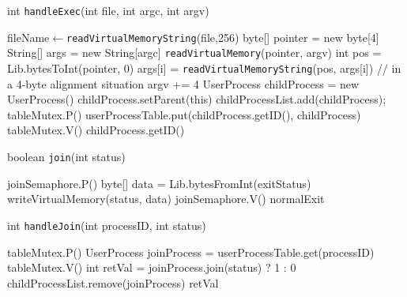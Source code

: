\documentclass{article}
\newcommand{\eq}{$\leftarrow$}
\begin{document}
\begin{spacing}{1.1}
\begin{algorithm}[htbp]
\label{alg:handleExec}
\caption{int \texttt{handleExec}(int file, int argc, int argv)}
  \begin{algorithmic}[1]
    \State fileName\eq\texttt{readVirtualMemoryString}(file,256)
    \EndIf
    \EndIf
      \State byte[] pointer = new byte[4]
      \State String[] args = new String[argc]
        \State \texttt{readVirtualMemory}(pointer, argv)
        \State int pos = Lib.bytesToInt(pointer, 0)
        \State args[i] = \texttt{readVirtualMemoryString}(pos, args[i])
        \State \colorbox{myyellow}{// in a 4-byte alignment situation}
        \State argv += 4
        \EndFor
    \State UserProcess childProcess = new UserProcess()
    \EndIf
    \State childProcess.setParent(this)
    \State childProcessList.add(childProcess);
    \State \colorbox{myyellow}{tableMutex.P()}
    \State userProcessTable.put(childProcess.getID(), childProcess)
    \State \colorbox{myyellow}{tableMutex.V()}
    \EndIf
    \Return childProcess.getID()
  \end{algorithmic}
\end{algorithm}

\begin{algorithm}[htbp]
\label{alg:join}
\caption{boolean \texttt{join}(int status)}
  \begin{algorithmic}
    \State joinSemaphore.P()
    \State byte[] data = Lib.bytesFromInt(exitStatus)
    \State writeVirtualMemory(status, data)
    \State joinSemaphore.V()
    \Return normalExit
  \end{algorithmic}
\end{algorithm}

\begin{algorithm}[htbp]
\label{alg:handleJoin}
\caption{int \texttt{handleJoin}(int processID, int status)}
  \begin{algorithmic}
    \State \colorbox{myyellow}{tableMutex.P()}
    \State UserProcess joinProcess = userProcessTable.get(processID)
    \State \colorbox{myyellow}{tableMutex.V()}
    \EndIf
    \State int retVal = joinProcess.join(status) ? 1 : 0
    \State childProcessList.remove(joinProcess)
    \Return retVal
  \end{algorithmic}
\end{algorithm}


\end{spacing}
\end{document}
